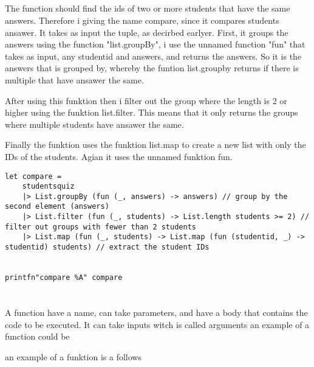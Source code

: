 \documentclass{article}
\begin{document}
\subsection{}

The function should find the ids of two or more students that have the same answers. Therefore i giving the name compare, since it compares students ansawer. It takes as input the tuple, as decirbed earlyer. First, it groups the answers using the function "list.groupBy", i use the unnamed function "fun" that takes as input, any studentid and answers, and returns the answers. So it is the answers that is grouped by, whereby the funtion list.groupby returns if there is multiple that have ansawer the same. 

After using this funktion then i filter out the group where the length is 2 or higher using the funktion list.filter. This means that it only returns the groups where multiple students have ansawer the same.

Finally the funktion uses the funktion list.map to create a new list with only the IDs of the students. Agian it uses the unnamed funktion fun.




 \begin{lstlisting}
let compare = 
    studentsquiz
    |> List.groupBy (fun (_, answers) -> answers) // group by the second element (answers)
    |> List.filter (fun (_, students) -> List.length students >= 2) // filter out groups with fewer than 2 students
    |> List.map (fun (_, students) -> List.map (fun (studentid, _) -> studentid) students) // extract the student IDs


printfn"compare %A" compare

    \end{lstlisting}



\section{}

\subsection{}

A function have a name, can take parameters, and have a body that contains the code to be executed.
It can take inputs witch is called arguments 
an example of a function could be 


an example of a funktion is a follows
\end{document}
